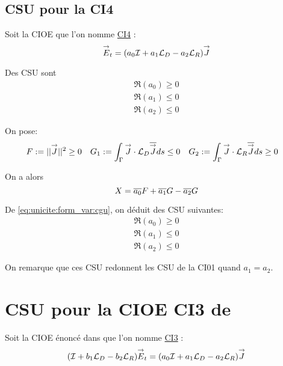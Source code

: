 \subsection{CSU pour la CI4}
  Soit la CIOE que l'on nomme \hyperlink{ci4}{CI4} :
  \begin{equation}
    \label{eq:unicite:ci4:ci4}
    {\overset{\rightarrow}{E}}_t = (a_0{\mathcal{I}} + a_1 {\mathcal{L}_D} - a_2 {\mathcal{L}_R} ) {\overset{\rightarrow}{J}}
  \end{equation}

  \begin{prop}
    Des CSU sont
    \begin{align}
      \Re(a_0) \ge 0
      \\
      \Re(a_1) \le 0
      \\
      \Re(a_2) \le 0
    \end{align}
  \end{prop}

  \begin{prop}
    On pose:
    \begin{align*}
      F &:= ||{\overset{\rightarrow}{J}}|| ^2 \ge 0  & G_1 &:= \int_\Gamma {\overset{\rightarrow}{J}}\cdot {\mathcal{L}_D}{\overline{{\overset{\rightarrow}{J}}}} ds \le 0 & G_2 &:= \int_\Gamma {\overset{\rightarrow}{J}}\cdot {\mathcal{L}_R}{\overline{{\overset{\rightarrow}{J}}}} ds \ge 0
    \end{align*}

    On a alors
    \begin{equation*}
      X = {\overline{a_0}}F + {\overline{a_1}}G - {\overline{a_2}}G
    \end{equation*}

    De \eqref{eq:unicite:form_var:cgu}, on déduit des CSU suivantes:
    \begin{align}
      \Re\left(a_0\right) \ge 0
      \\
      \Re\left(a_1\right) \le 0
      \\
      \Re\left(a_2\right) \le 0
    \end{align}
  \end{prop}

  On remarque que ces CSU redonnent les CSU de la CI01 quand \(a_1=a_2\).

\section{CSU pour la CIOE CI3 de \cite{aubakirov_electromagnetic_2014}}

  Soit la CIOE énoncé dans \cite{aubakirov_electromagnetic_2014} que l'on nomme \hyperlink{ci3}{CI3} :
  \begin{equation}
    \label{eq:unicite:ci3:ci3}
    ( {\mathcal{I}} + b_1 {\mathcal{L}_D} - b_2 {\mathcal{L}_R}){\overset{\rightarrow}{E}}_t = (a_0{\mathcal{I}} + a_1 {\mathcal{L}_D} - a_2 {\mathcal{L}_R} ) {\overset{\rightarrow}{J}}
  \end{equation}

